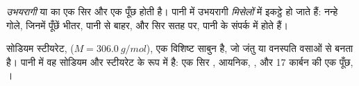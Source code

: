 \begin{definition}[उभयरागी अणु, मिसेल]\label{def:g11:dissolution:amphiphilic}
\emph{उभयरागी}  या  का एक  सिर और एक
 पूँछ होती है। पानी में उभयरागी 
\emph{मिसेलों} में इकट्ठे हो जाते हैं: नन्हे गोले, जिनमें पूँछें
भीतर, पानी से बाहर, और सिर सतह पर, पानी के संपर्क में
होते हैं।
\end{definition}

\begin{example}[एक साबुन]\label{ex:g11:dissolution:soap}
सोडियम स्टीयरेट,  ($M = \qty{306.0}{g/mol}$), एक
विशिष्ट साबुन है, जो जंतु या वनस्पति वसाओं से बनता है। पानी में वह
सोडियम   और स्टीयरेट   के रूप में  है: एक सिर
, आयनिक, , और 17 कार्बन  की एक पूँछ,
।
\end{example}

